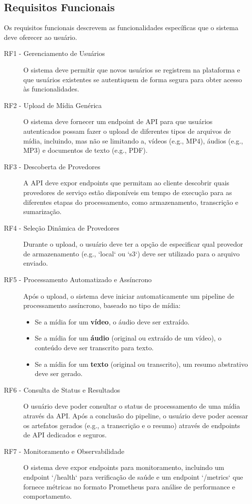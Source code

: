 \subsection{Requisitos Funcionais}
\label{sec:requisitos_funcionais}

Os requisitos funcionais descrevem as funcionalidades específicas que o sistema deve oferecer ao usuário.

\begin{description}
    \item [RF1 - Gerenciamento de Usuários] O sistema deve permitir que novos usuários se registrem na plataforma e que usuários existentes se autentiquem de forma segura para obter acesso às funcionalidades.

    \item [RF2 - Upload de Mídia Genérica] O sistema deve fornecer um endpoint de API para que usuários autenticados possam fazer o upload de diferentes tipos de arquivos de mídia, incluindo, mas não se limitando a, vídeos (e.g., MP4), áudios (e.g., MP3) e documentos de texto (e.g., PDF).

    \item [RF3 - Descoberta de Provedores] A API deve expor endpoints que permitam ao cliente descobrir quais provedores de serviço estão disponíveis em tempo de execução para as diferentes etapas do processamento, como armazenamento, transcrição e sumarização.

    \item [RF4 - Seleção Dinâmica de Provedores] Durante o upload, o usuário deve ter a opção de especificar qual provedor de armazenamento (e.g., `local` ou `s3`) deve ser utilizado para o arquivo enviado.

    \item [RF5 - Processamento Automatizado e Assíncrono] Após o upload, o sistema deve iniciar automaticamente um pipeline de processamento assíncrono, baseado no tipo de mídia:
    \begin{itemize}
        \item Se a mídia for um \textbf{vídeo}, o áudio deve ser extraído.
        \item Se a mídia for um \textbf{áudio} (original ou extraído de um vídeo), o conteúdo deve ser transcrito para texto.
        \item Se a mídia for um \textbf{texto} (original ou transcrito), um resumo abstrativo deve ser gerado.
    \end{itemize}

    \item [RF6 - Consulta de Status e Resultados] O usuário deve poder consultar o status de processamento de uma mídia através da API. Após a conclusão do pipeline, o usuário deve poder acessar os artefatos gerados (e.g., a transcrição e o resumo) através de endpoints de API dedicados e seguros.

    \item [RF7 - Monitoramento e Observabilidade] O sistema deve expor endpoints para monitoramento, incluindo um endpoint `/health` para verificação de saúde e um endpoint `/metrics` que fornece métricas no formato Prometheus para análise de performance e comportamento.
\end{description}
